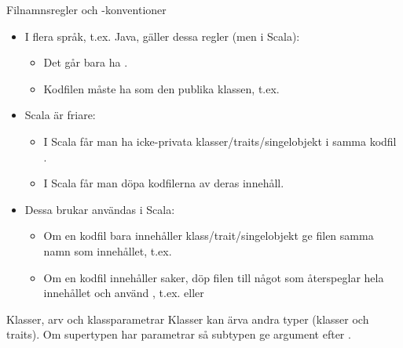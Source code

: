 \begin{Slide}{Filnamnsregler och -konventioner}\SlideFontSmall
\begin{itemize}
\item I flera språk, t.ex. Java, gäller dessa regler (men  i Scala):
\begin{itemize}\SlideFontTiny
\item Det går bara ha .
\item Kodfilen måste ha  som den publika klassen, t.ex. 
\end{itemize}
\item Scala är friare:
\begin{itemize}\SlideFontTiny
\item I Scala får man ha  icke-privata klasser/traits/singelobjekt i samma kodfil .
\item I Scala får man döpa kodfilerna  av deras innehåll. \pause 
\end{itemize}

\item Dessa  brukar användas i Scala:
\begin{itemize}\SlideFontTiny
\item Om en kodfil bara innehåller  klass/trait/singelobjekt ge filen samma namn som innehållet, t.ex. 
\item Om en kodfil innehåller  saker, döp filen till något som återspeglar hela innehållet och använd , t.ex.  eller 
\end{itemize}
\end{itemize}
\end{Slide}


\begin{Slide}{Klasser, arv och klassparametrar}\SlideFontTiny
Klasser kan ärva andra typer (klasser och traits). Om supertypen har parametrar så  subtypen ge argument efter .

\ifkompendium
{}
\else
{}
\fi 
\end{Slide}


